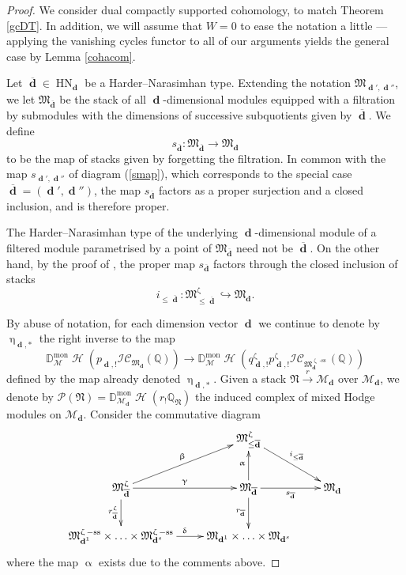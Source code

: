 \documentclass[a4paper,10pt]{amsart}
\renewcommand{\alpha}{\upalpha}
\renewcommand{\beta}{\upbeta}
\renewcommand{\gamma}{\upgamma}
\renewcommand{\delta}{\updelta}
\renewcommand{\zeta}{\upzeta}
\renewcommand{\eta}{\upeta}
\newcommand{\DD}{\mathbb{D}}
\DeclareMathOperator{\HN}{HN}
\newcommand{\IS}{\mathcal{P}}
\newcommand{\QQ}{\mathbb{Q}}
\newcommand{\Mst}{\mathfrak{M}}
\newcommand{\Msp}{\mathcal{M}}
\newcommand{\ICS}{\mathcal{IC}}
\DeclareMathOperator{\sst}{-ss}
\DeclareMathOperator{\mon}{mon}
\DeclareMathOperator{\dd}{\mathbf{d}}
\DeclareMathOperator{\Ho}{\mathcal{H}}
\begin{document}
\begin{proof}

We consider dual compactly supported cohomology, to match Theorem \ref{gcDT}.  In addition, we will assume that $W=0$ to ease the notation a little ---  applying the vanishing cycles functor to all of our arguments yields the general case by Lemma \ref{cohacom}.

Let $\overline{\dd}\in\HN_{\dd}$ be a Harder--Narasimhan type.  Extending the notation $\Mst_{\dd',\dd''}$, we let $\Mst_{\overline{\dd}}$ be the stack of all $\dd$-dimensional modules equipped with a filtration by submodules with the dimensions of successive subquotients given by $\overline{\dd}$.  We define
\[
s_{\overline{\dd}}\colon\Mst_{\overline{\dd}}\rightarrow \Mst_{\dd}
\]
to be the map of stacks given by forgetting the filtration.  In common with the map $s_{\dd',\dd''}$ of diagram (\ref{smap}), which corresponds to the special case $\overline{\dd}=(\dd',\dd'')$, the map $s_{\overline{\dd}}$ factors as a proper surjection and a closed inclusion, and is therefore proper.  

The Harder--Narasimhan type of the underlying $\dd$-dimensional module of a filtered module parametrised by a point of $\Mst_{\overline{\dd}}$ need not be $\overline{\dd}$.  On the other hand, by the proof of \cite[Prop.3.7]{Reineke_HN}, the proper map $s_{\overline{\dd}}$ factors through the closed inclusion of stacks
\[
i_{\leq \overline{\dd}}\colon\Mst^{\zeta}_{\leq\overline{\dd}}\hookrightarrow \Mst_{\dd}.
\]

By abuse of notation, for each dimension vector $\dd$ we continue to denote by $\eta_{\dd,*}$ the right inverse to the map
\[
\DD^{\mon}_{\Msp}\Ho\left(p_{\dd,!}\ICS_{\Mst_{\dd}}(\QQ)\right)\rightarrow \DD^{\mon}_{\Msp}\Ho\left(q_{\dd,!}^{\zeta}p_{\dd,!}^{\zeta}\ICS_{\Mst^{\zeta\sst}_{\dd}}(\QQ)\right)
\]
defined by the map already denoted $\eta_{\dd,*}$.  Given a stack $\mathfrak{N}\xrightarrow{r} \Msp_{\dd}$ over $\Msp_{\dd}$, we denote by $\IS(\mathfrak{N})=\DD^{\mon}_{\Msp_{\dd}}\Ho(r_!\QQ_{\mathfrak{N}})$ the induced complex of mixed Hodge modules on $\Msp_{\dd}$.  Consider the commutative diagram
\[
\xymatrix{
&\Mst_{\leq \overline{\dd}}^{\zeta}\ar[dr]^{i_{\leq\overline{\dd}}}\\
\Mst_{\overline{\dd}}^{\zeta}\ar[d]_{r_{\overline{\dd}}^{\zeta}}\ar[ur]^{\beta}\ar[r]^{\gamma} & \Mst_{\overline{\dd}} \ar[u]^{\alpha}\ar[r]_{s_{\overline{\dd}}} \ar[d]_{r_{\overline{\dd}}}& \Mst_{\dd}\\
\Mst_{\dd^1}^{\zeta\sst}\times\ldots\times\Mst_{\dd^s}^{\zeta\sst}\ar[r]^{\delta} & \Mst_{\dd^1}\times\ldots\times\Mst_{\dd^s}
}
\]
where the map $\alpha$ exists due to the comments above.


\end{proof}
\end{document}
